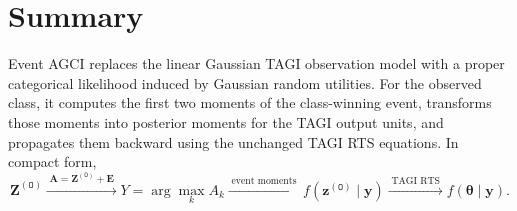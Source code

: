 \documentclass[11pt]{article}
\newcommand{\Olayer}{\mathtt{O}}
\begin{document}
\section{Summary}

Event AGCI replaces the linear Gaussian TAGI observation model with a proper
categorical likelihood induced by Gaussian random utilities.  For the observed
class, it computes the first two moments of the class-winning event, transforms
those moments into posterior moments for the TAGI output units, and propagates
them backward using the unchanged TAGI RTS equations.  In compact form,
\begin{equation}
\boxed{
\bm Z^{(\Olayer)}
\xrightarrow{\;\bm A=\bm Z^{(\Olayer)}+\bm E\;}
Y=\arg\max_k A_k
\xrightarrow{\;\text{event moments}\;}
f(\bm z^{(\Olayer)}\mid\bm y)
\xrightarrow{\;\text{TAGI RTS}\;}
f(\bm\theta\mid\bm y).}
\end{equation}
\end{document}
